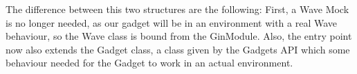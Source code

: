 The difference between this two structures are the following: First, a Wave Mock is no longer needed, as our gadget will be in an environment with a real Wave behaviour, so the Wave class is bound from the GinModule. Also, the entry point now also extends the Gadget class, a class given by the Gadgets API which some behaviour needed for the Gadget to work in an actual environment.








